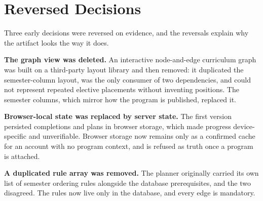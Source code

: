 \section{Reversed Decisions}

Three early decisions were reversed on evidence, and the reversals explain why the artifact looks
the way it does.

\textbf{The graph view was deleted.} An interactive node-and-edge curriculum graph was built on a
third-party layout library and then removed: it duplicated the semester-column layout, was the only
consumer of two dependencies, and could not represent repeated elective placements without inventing
positions. The semester columns, which mirror how the program is published, replaced it.

\textbf{Browser-local state was replaced by server state.} The first version persisted completions
and plans in browser storage, which made progress device-specific and unverifiable. Browser storage
now remains only as a confirmed cache for an account with no program context, and is refused as
truth once a program is attached.

\textbf{A duplicated rule array was removed.} The planner originally carried its own list of
semester ordering rules alongside the database prerequisites, and the two disagreed. The rules now
live only in the database, and every edge is mandatory.
